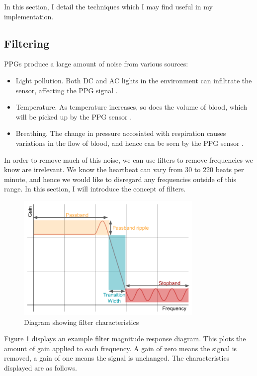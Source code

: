 \documentclass[12pt,a4paper,twoside,openright]{report}
\begin{document}
In this section, I detail the techniques which I may find useful in my
implementation.

\subsection{Filtering} \label{sec:intro-filters}

PPGs produce a large amount of noise from various sources:
\begin{itemize}
	\item Light pollution. Both DC and AC lights in the environment can
		infiltrate the sensor, affecting the PPG signal \cite{kim15}.
	\item Temperature. As temperature increases, so does the volume of
		blood, which will be picked up by the PPG sensor 
		\cite{shin16}.
	\item Breathing. The change in pressure accosiated with respiration
		causes variations in the flow of blood, and hence can be seen
		by the PPG sensor \cite{allen02}.
\end{itemize}

In order to remove much of this noise, we can use filters to remove
frequencies we know are irrelevant. We know the heartbeat can vary from 
30 to 220 beats per minute, and hence we would like to disregard any
frequencies 
outside of this range. In this section, I will introduce the concept of 
filters.

\begin{figure}[h!]
	\centerline{\includegraphics[width=0.8\textwidth]{figs/filter.png}}
\caption{Diagram showing filter characteristics}
\label{fig:filterdiag}
\end{figure}

Figure \ref{fig:filterdiag} displays an example filter magnitude response
diagram. This plots the amount of gain applied to each frequency. A gain of
zero means the signal is removed, a gain of one means the signal is unchanged.
The characteristics displayed are as follows.
\end{document}
